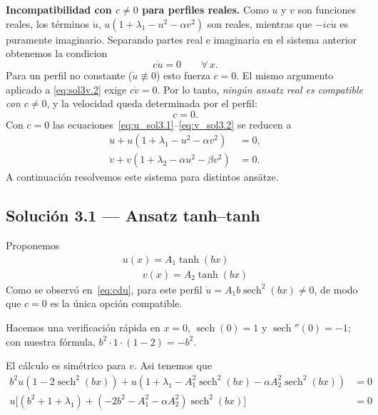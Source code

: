 \documentclass[letterpaper,11pt]{exam}
\newcommand{\sech}{\operatorname{sech}}
\theoremstyle{plain}
\begin{document}
\medskip
\noindent\textbf{Incompatibilidad con $c\neq 0$ para perfiles reales.}
Como $u$ y $v$ son funciones reales, los términos $\ddot{u}$, $u(1+\lambda_1 - u^2-\alpha v^2)$
son reales, mientras que $-ic\dot{u}$ es puramente imaginario. Separando partes real e imaginaria
en el sistema anterior obtenemos  la condicion 
\begin{equation}
    c\dot{u} = 0 \qquad \forall\,x.
    \label{eq:cdu}
\end{equation}
Para un perfil no constante ($\dot{u}\not\equiv 0$) esto fuerza $c=0$. El mismo argumento
aplicado a \eqref{eq:sol3v.2} exige $c\dot{v}=0$. Por lo tanto, \emph{ningún ansatz real
es compatible con $c\neq 0$}, y la velocidad queda determinada por el perfil:
\begin{equation}
    c = 0.
    \label{eq:c0}
\end{equation}
Con $c=0$ las ecuaciones~\eqref{eq:u_sol3.1}--\eqref{eq:v_sol3.2} se reducen a
\begin{align}
    \ddot{u} + u(1+\lambda_1 - u^2 - \alpha v^2) &= 0, \label{eq:sol3u0}\\
    \ddot{v} + v(1+\lambda_2 - \alpha u^2 - \beta v^2) &= 0. \label{eq:sol3v0}
\end{align}
A continuación resolvemos este sistema para distintos ansätze.

\subsection{Solución 3.1 — Ansatz tanh--tanh}
\label{sec:sol31}

Proponemos
\begin{align*}
    u(x) = A_1\tanh(bx) \\
    \qquad v(x) = A_2\tanh(bx)
\end{align*}
Como se observó en~\eqref{eq:cdu}, para este perfil $\dot{u} = A_1 b\operatorname{sech}^2(bx)\neq 0$,
de modo que $c=0$ es la única opción compatible.

Hacemos una verificación rápida en $x=0$, $\sech(0)=1$ y $\sech''(0)=-1$; con nuestra fórmula, $b^2 \cdot 1 \cdot (1-2)=-b^2$. 

El cálculo es simétrico para $v$. Asi tenemos que
\begin{align*}
    b^2u(1-2\sech^2(bx))+u(1+\lambda_1-A_1^2\sech^2(bx)-\alpha A_2^2\sech^2(bx))&=0\\
    u\bigl[(b^2+1+\lambda_1)+(-2b^2-A_1^2-\alpha A_2^2)\sech^2(bx)\bigr]&=0
\end{align*}
\end{document}

